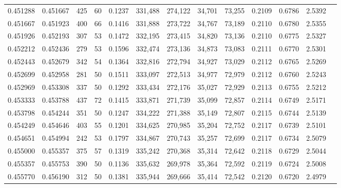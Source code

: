 \begin{tabular}{rrrrrrrrrrrrr}
0.451288 & 0.451667 &    425 &    60 &                                     0.1237 & 331,488 & 274,122 &  34,701 &  73,255 & 0.2109 & 0.6786 & 2.5392 \\
0.451667 & 0.451923 &    400 &    66 &                                     0.1416 & 331,888 & 273,722 &  34,767 &  73,189 & 0.2110 & 0.6780 & 2.5355 \\
0.451926 & 0.452193 &    307 &    53 &                                     0.1472 & 332,195 & 273,415 &  34,820 &  73,136 & 0.2110 & 0.6775 & 2.5327 \\
0.452212 & 0.452436 &    279 &    53 &                                     0.1596 & 332,474 & 273,136 &  34,873 &  73,083 & 0.2111 & 0.6770 & 2.5301 \\
0.452443 & 0.452679 &    342 &    54 &                                     0.1364 & 332,816 & 272,794 &  34,927 &  73,029 & 0.2112 & 0.6765 & 2.5269 \\
0.452699 & 0.452958 &    281 &    50 &                                     0.1511 & 333,097 & 272,513 &  34,977 &  72,979 & 0.2112 & 0.6760 & 2.5243 \\
0.452969 & 0.453308 &    337 &    50 &                                     0.1292 & 333,434 & 272,176 &  35,027 &  72,929 & 0.2113 & 0.6755 & 2.5212 \\
0.453333 & 0.453788 &    437 &    72 &                                     0.1415 & 333,871 & 271,739 &  35,099 &  72,857 & 0.2114 & 0.6749 & 2.5171 \\
0.453798 & 0.454244 &    351 &    50 &                                     0.1247 & 334,222 & 271,388 &  35,149 &  72,807 & 0.2115 & 0.6744 & 2.5139 \\
0.454249 & 0.454646 &    403 &    55 &                                     0.1201 & 334,625 & 270,985 &  35,204 &  72,752 & 0.2117 & 0.6739 & 2.5101 \\
0.454651 & 0.454994 &    242 &    53 &                                     0.1797 & 334,867 & 270,743 &  35,257 &  72,699 & 0.2117 & 0.6734 & 2.5079 \\
0.455000 & 0.455357 &    375 &    57 &                                     0.1319 & 335,242 & 270,368 &  35,314 &  72,642 & 0.2118 & 0.6729 & 2.5044 \\
0.455357 & 0.455753 &    390 &    50 &                                     0.1136 & 335,632 & 269,978 &  35,364 &  72,592 & 0.2119 & 0.6724 & 2.5008 \\
0.455770 & 0.456190 &    312 &    50 &                                     0.1381 & 335,944 & 269,666 &  35,414 &  72,542 & 0.2120 & 0.6720 & 2.4979 \\

\end{tabular}
